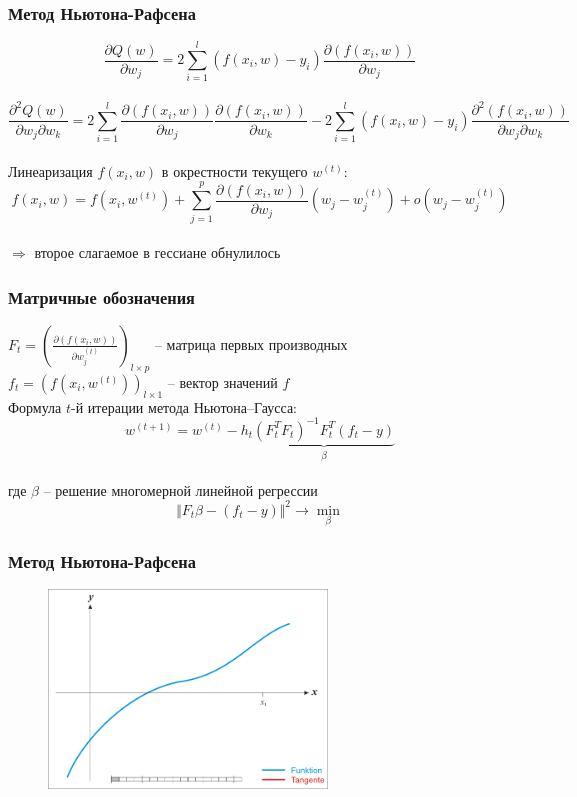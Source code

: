 \documentclass[10pt]{beamer}
\begin{document}
\begin{frame}\frametitle{Метод Ньютона-Рафсена}
$$\frac{\partial Q(w)}{\partial w_j} = 2 \sum\limits_{i=1}^l (f(x_i, w) - y_i ) \frac{\partial(f(x_i, w))}{\partial w_j}$$\\
$$\frac{\partial^2 Q(w)}{\partial w_j \partial w_k} = 2 \sum\limits_{i=1}^l \frac{\partial(f(x_i, w))}{\partial w_j} \frac{\partial(f(x_i, w))}{\partial w_k} - 2 \sum\limits_{i=1}^l (f(x_i, w) - y_i ) \frac{\partial^2 (f(x_i, w))}{\partial w_j \partial w_k}$$\\
\vspace{5mm}
Линеаризация $f(x_i, w)$ в окрестности текущего $w^{(t)}$:\\
$$f(x_i, w) = f(x_i, w^{(t)}) + \sum\limits_{j=1}^p \frac{\partial(f(x_i, w))}{\partial w_j} (w_j - w_j^{(t)}) + o(w_j -w_j^{(t)})$$\\
$\Rightarrow$ второе слагаемое в гессиане обнулилось
\end{frame}

\begin{frame}\frametitle{Матричные обозначения}
$F_t = \left(\frac{\partial(f(x_i, w))}{\partial w_j^{(t)}}\right)_{l \times p}$ -- матрица первых производных\\
$f_t = \left( f(x_i, w^{(t)}) \right)_{l \times 1}$ -- вектор значений $f$\\
\vspace{5mm}
Формула $t$-й итерации метода Ньютона–Гаусса:\\
$$w^{(t+1)} = w^{(t)} - h_t \underbrace{\left( F^T_tF_t \right)^{-1} F_t^T(f_t -y)}_{\beta}$$\\
где $\beta$ -- решение многомерной линейной регрессии\\
$$\Vert F_t\beta - (f_t-y) \Vert^2 \rightarrow \min_{\beta}$$ 
\end{frame}

\begin{frame}\frametitle{Метод Ньютона-Рафсена}
\begin{figure}[htbp]
  \includegraphics[height=150pt, keepaspectratio = true]{images/newton-1}   
\end{figure}
\end{frame}
\end{document}
